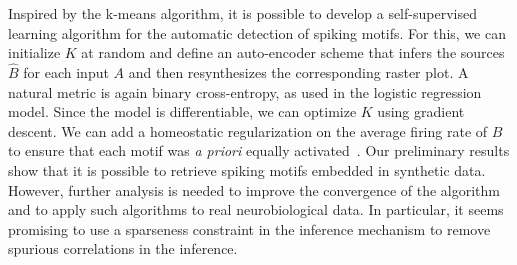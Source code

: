 \documentclass[runningheads]{llncs}
\newcommand{\kernel}{K} %
\begin{document}
Inspired by the k-means algorithm, it is possible to develop a self-supervised learning algorithm for the automatic detection of spiking motifs. For this, we can initialize $\kernel$ at random and define an auto-encoder scheme that infers the sources $\hat{B}$ for each input $A$ and then resynthesizes the corresponding raster plot. A natural metric is again binary cross-entropy, as used in the logistic regression model. Since the model is differentiable, we can optimize $\kernel$ using gradient descent. We can add a homeostatic regularization on the average firing rate of $B$ to ensure that each motif was \emph{a priori} equally activated~\cite{perrinet_adaptive_2019}. Our preliminary results show that it is possible to retrieve spiking motifs embedded in synthetic data. However, further analysis is needed to improve the convergence of the algorithm and to apply such algorithms to real neurobiological data. In particular, it seems promising to use a sparseness constraint in the inference mechanism to remove spurious correlations in the inference.
%
% 
% 
\end{document}
